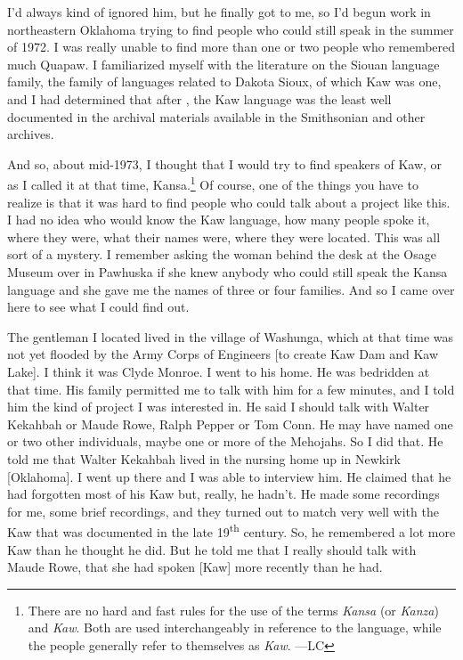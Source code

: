 \documentclass[output=paper]{LSP/langsci}
\begin{document}
I'd always kind of ignored him, but he finally got to me, so I'd begun work in northeastern Oklahoma trying to find people who could still speak  in the summer of 1972. I was really unable to find more than one or two people who remembered much Quapaw. I familiarized myself with the literature on the Siouan language family, the family of languages related to Dakota Sioux, of which Kaw was one, and I had determined that after , the Kaw language was the least well documented in the archival materials available in the Smithsonian and other archives. 

 
And so, about mid-1973, I thought that I would try to find speakers of Kaw, or as I called it at that time, Kansa.\footnote{There are no hard and fast rules for the use of the terms \textit{Kansa} (or \textit{Kanza}) and \textit{Kaw}. Both are used interchangeably in reference to the language, while the people generally refer to themselves as \textit{Kaw}. ---LC} Of course, one of the things you have to realize is that it was hard to find people who could talk about a project like this. I had no idea who would know the Kaw language, how many people spoke it, where they were, what their names were, where they were located. This was all sort of a mystery. I remember asking the woman behind the desk at the Osage Museum over in Pawhuska if she knew anybody who could still speak the Kansa language and she gave me the names of three or four families. And so I came over here to see what I could find out. 
 

The gentleman I located lived in the village of Washunga, which at that time was not yet flooded by the Army Corps of Engineers [to create Kaw Dam and Kaw Lake]. I think it was Clyde Monroe. I went to his home. He was bedridden at that time. His family permitted me to talk with him for a few minutes, and I told him the kind of project I was interested in. He said I should talk with Walter Kekahbah or Maude Rowe, Ralph Pepper or Tom Conn. He may have named one or two other individuals, maybe one or more of the Mehojahs. So I did that. He told me that Walter Kekahbah lived in the nursing home up in Newkirk [Oklahoma]. I went up there and I was able to interview him. He claimed that he had forgotten most of his Kaw but, really, he hadn't. He made some recordings for me, some brief recordings, and they turned out to match very well with the Kaw that was documented in the late 19\textsuperscript{th} century. So, he remembered a lot more Kaw than he thought he did. But he told me that I really should talk with Maude Rowe, that she had spoken [Kaw] more recently than he had. 
\end{document}
